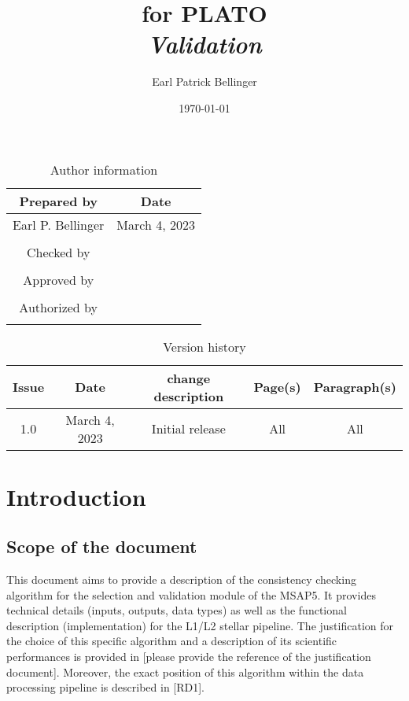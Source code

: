 \documentclass[a4paper, oneside, 11pt, article, english]{memoir}
\author{Earl Patrick Bellinger}
\title{\shorttitle{} for PLATO \\ \Large\textit{Validation}}
\date{\today}
\begin{document}
\maketitle

\begin{table}[htbp]
  \centering
  \caption{Author information}
  \label{tab:author}
  \begin{tabular}{cc}
    \toprule
    Prepared by & Date\\
    \midrule
    Earl P. Bellinger & March 4, 2023 \\
    \\
    Checked by \\
    \midrule
    \\
    Approved by \\
    \midrule
    \\
    Authorized by \\
    \midrule
    \\
    \bottomrule
  \end{tabular}
\end{table}

\begin{table}[htbp]
  \centering
  \caption{Version history}
  \label{tab:version}
  \begin{tabular}{ccccc}
    \toprule
    Issue & Date & \textnumero{} change description & Page(s) & Paragraph(s) \\
    \midrule
    1.0 & March 4, 2023 & Initial release & All & All \\
    \bottomrule
  \end{tabular}
\end{table}


\clearpage
\tableofcontents*
\clearpage


\chapter{Introduction}
\label{chap:intro}

\section{Scope of the document}
\label{sec:scope}

This document aims to provide a description of the consistency checking algorithm for the selection and validation module of the MSAP5. It
provides technical details (inputs, outputs, data types) as well as the
functional description (implementation) for the L1/L2 stellar pipeline. The
justification for the choice of this specific algorithm and a description of its
scientific performances is provided in [please provide the reference of the
justification document]. Moreover, the exact position of this algorithm within
the data processing pipeline is described in [RD1]. %
\end{document}

